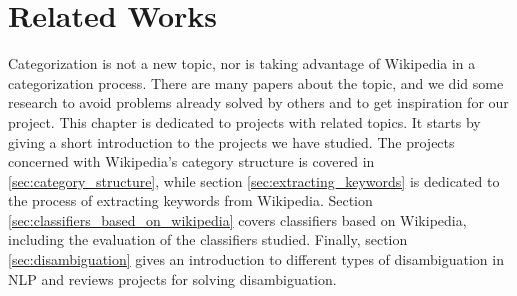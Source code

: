 \chapter{Related Works}
Categorization is not a new topic, nor is taking advantage of Wikipedia in a categorization process. There are many papers about the topic, and we did some research to avoid problems already solved by others and to get inspiration for our project. This chapter is dedicated to projects with related topics. It starts by giving a short introduction to the projects we have studied.
The  projects concerned with Wikipedia's category structure is covered in \ref{sec:category_structure}, while section \ref{sec:extracting_keywords} is dedicated to the process of extracting keywords from Wikipedia. 
Section \ref{sec:classifiers_based_on_wikipedia} covers classifiers based on Wikipedia, including the evaluation of the classifiers studied. Finally, section \ref{sec:disambiguation} gives an introduction to different types of disambiguation in NLP and reviews projects for solving disambiguation. 

\begin{comment}

, before it covers two tasks within the implementation; \emph{extracting keywords} and \emph{deciding content of Wikipedia articles based on the category structure}. Section \ref{sec:disambiguation} is dedicated to different approaches for solving ambiguous words and phrases which is one of the most discussed problems in NLP. Finally, the chapter reviews different approaches of evaluating the classifier and reviews some of the results found in other projects. 




\begin{comment}
Extracting Semantic Relationships between Wikipedia Categories
    - chernov2006extracting
Identifying document topics using the Wikipedia category network: 

All Our N-Gram are Belong to You: Encknowledge
Overcoming the Brittleness Bottleneck using Wikipedia: Enhancing Text Categorization with Encyclopedic Knowledge: brittleness
Entity Extraction, Linking, Classification, and Tagging for Social Media: A Wikipedia-based Approach: entityextraction
Large-Scale Taxonomy Mapping for Restructuring and Integrating Wikipedia: ponzetto2009large
Automatic ontology extraction for document classification: kozlova2005automatic

named entity disambiguation by leveraging wikipedia semantic knowledge: han2009named
large-scaled named entity disambiguation based on Wikipedia data: cucerzan2007large

decoding wikipedia categories for knowledge adcquistion: nastase2008decoding
\end{comment}

